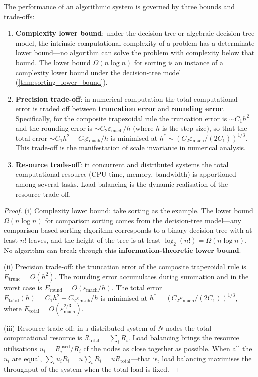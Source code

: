 \begin{theorem}\label{thm:algorithm_conservation}
The performance of an algorithmic system is governed by three bounds and trade-offs:
\begin{enumerate}[label=(\roman*)]
    \item \textbf{Complexity lower bound}: under the decision-tree or algebraic-decision-tree model, the intrinsic computational complexity of a problem has a determinate lower bound---no algorithm can solve the problem with complexity below that bound. The lower bound $\Omega(n \log n)$ for sorting is an instance of a complexity lower bound under the decision-tree model (\cref{thm:sorting_lower_bound}).
    \item \textbf{Precision trade-off}: in numerical computation the total computational error is traded off between \textbf{truncation error} and \textbf{rounding error}. Specifically, for the composite trapezoidal rule the truncation error is $\sim C_1 h^2$ and the rounding error is $\sim C_2 \varepsilon_{\text{mach}}/h$ (where $h$ is the step size), so that the total error $\sim C_1 h^2 + C_2 \varepsilon_{\text{mach}}/h$ is minimised at $h^* \sim (C_2 \varepsilon_{\text{mach}}/(2 C_1))^{1/3}$. This trade-off is the manifestation of scale invariance in numerical analysis.
    \item \textbf{Resource trade-off}: in concurrent and distributed systems the total computational resource (CPU time, memory, bandwidth) is apportioned among several tasks. Load balancing is the dynamic realisation of the resource trade-off.
\end{enumerate}
\end{theorem}

\begin{proof}
(i) Complexity lower bound: take sorting as the example. The lower bound $\Omega(n \log n)$ for comparison sorting comes from the decision-tree model---any comparison-based sorting algorithm corresponds to a binary decision tree with at least $n!$ leaves, and the height of the tree is at least $\log_2(n!) = \Omega(n \log n)$. No algorithm can break through this \textbf{information-theoretic lower bound}.

(ii) Precision trade-off: the truncation error of the composite trapezoidal rule is $E_{\text{trunc}} = O(h^2)$. The rounding error accumulates during summation and in the worst case is $E_{\text{round}} = O(\varepsilon_{\text{mach}}/h)$. The total error $E_{\text{total}}(h) = C_1 h^2 + C_2 \varepsilon_{\text{mach}}/h$ is minimised at $h^* = (C_2 \varepsilon_{\text{mach}}/(2 C_1))^{1/3}$, where $E_{\text{total}} = O(\varepsilon_{\text{mach}}^{2/3})$.

(iii) Resource trade-off: in a distributed system of $N$ nodes the total computational resource is $R_{\text{total}} = \sum_i R_i$. Load balancing brings the resource utilisations $u_i = R_i^{\text{used}}/R_i$ of the nodes as close together as possible. When all the $u_i$ are equal, $\sum_i u_i R_i = u \sum_i R_i = u R_{\text{total}}$---that is, load balancing maximises the throughput of the system when the total load is fixed.
\end{proof}

